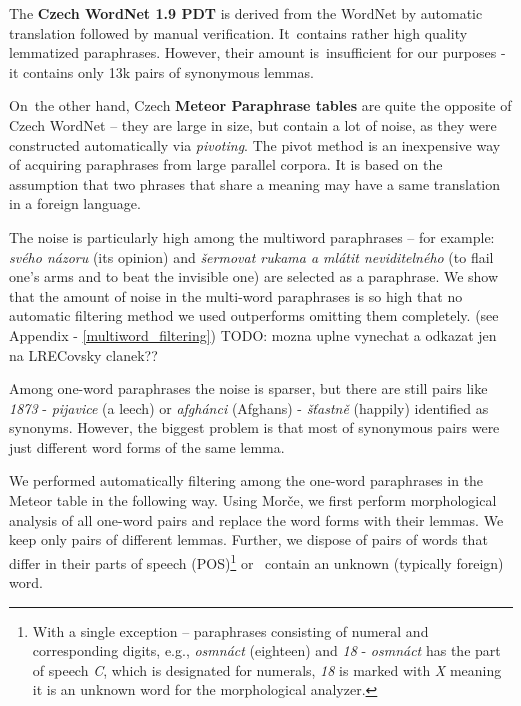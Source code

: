 \documentclass[11pt]{article}
\def\Tref#1{Table~\ref{#1}}
\begin{document}
The \textbf{Czech WordNet 1.9 PDT} is derived from the WordNet \cite{wordnet} 
by automatic translation followed by manual verification. It~contains rather 
high quality lemmatized paraphrases. However, their amount is~insufficient for 
our purposes - it contains only 13k pairs of synonymous lemmas. %

On~the other hand, Czech \textbf{Meteor Paraphrase tables} are quite the 
opposite of Czech WordNet -- they are large in size, but contain a lot of 
noise, as they were constructed automatically via \textit{pivoting}. 
\cite{pivoting} The pivot method is an inexpensive way of acquiring paraphrases 
from large parallel corpora. It is based on the assumption that two phrases 
that share a meaning may have a same translation in a foreign language. 
\cite{dyvik}

The noise is particularly high among the multiword paraphrases -- for 
example: \textit{svého názoru} (its opinion) and \textit{šermovat rukama a 
mlátit neviditelného} (to flail one's arms and to beat the invisible one) are 
selected as a paraphrase. We show that the amount of noise in the multi-word 
paraphrases is so high that no automatic filtering method we used outperforms 
omitting them completely. (see Appendix - \ref{multiword_filtering}) 
TODO: mozna uplne vynechat a odkazat jen na LRECovsky clanek??
 
Among one-word paraphrases the noise is sparser, but there are still pairs like 
\textit{1873} - \textit{pijavice} (a leech) or \textit{afgh\'{a}nci} (Afghans) -
\textit{š\v{t}astně} (happily) identified as synonyms. However, the biggest 
problem is that most of synonymous pairs were just different word forms of the 
same lemma. 

We performed automatically filtering among the one-word paraphrases in the 
Meteor table in the following way. Using Morče, we first perform morphological 
analysis of all one-word pairs and replace the word forms with their lemmas. We 
keep only pairs of different lemmas. Further, we dispose of pairs of words that 
differ in their parts of speech (POS)\footnote{With a single exception -- 
paraphrases consisting of numeral and corresponding digits, e.g., 
\textit{osmnáct} (eighteen) and \textit{18} - \textit{osmnáct} has the part of 
speech \textit{C}, which is designated for numerals, \textit{18} is marked with 
\textit{X} meaning it is an unknown word for the morphological analyzer.} or
~contain an unknown (typically foreign) word.
\end{document}
